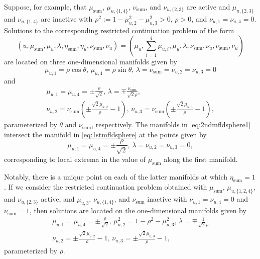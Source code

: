 Suppose, for example, that $\mu_\mathrm{sum}$, $\mu_{u,\{1,4\}}$, $\nu_\mathrm{sum}$, and $\nu_{u,\{2,3\}}$ are active and $\mu_{u,\{2,3\}}$ and $\nu_{u,\{1,4\}}$ are inactive with $\rho^2:=1-\mu_{u,2}^2-\mu_{u,3}^2>0$, $\rho>0$, and $\nu_{u,1}=\nu_{u,4}=0$. Solutions to the corresponding restricted continuation problem of the form
\begin{equation}
\left(u,\mu_\mathrm{sum},\mu_{u},\lambda,\eta_\mathrm{sum},\eta_{u},\nu_\mathrm{sum},\nu_{u}\right)=\left(\mu_u,\sum_{i=1}^4\mu_{u,i},\mu_{u},\lambda,\nu_\mathrm{sum},\nu_{u},\nu_\mathrm{sum},\nu_{u}\right)
\end{equation}
are located on three one-dimensional manifolds given by
\begin{equation}
\label{eq:1stmfldsphere}
\mu_{u,1}=\rho\cos\theta,\,\mu_{u,4}=\rho\sin\theta,\,\lambda=\nu_\mathrm{sum}=\nu_{u,2}=\nu_{u,3}=0
\end{equation}
and
\begin{gather}
\label{eq:2ndmfldsphere1}
\mu_{u,1}=\mu_{u,4}=\pm\frac{\rho}{\sqrt{2}},\,\lambda=\mp\frac{\nu_\mathrm{sum}}{\sqrt{2}\rho},\\\nu_{u,2}=\nu_\mathrm{sum}\left(\pm\frac{\sqrt{2}\mu_{u,2}}{\rho}-1\right),\,\nu_{u,3}=\nu_\mathrm{sum}\left(\pm\frac{\sqrt{2}\mu_{u,3}}{\rho}-1\right),
\label{eq:2ndmfldsphere2}
\end{gather}
parameterized by $\theta$ and $\nu_\mathrm{sum}$, respectively. The manifolds in \eqref{eq:2ndmfldsphere1} intersect the manifold in \eqref{eq:1stmfldsphere} at the points given by
\begin{equation}
\mu_{u,1}=\mu_{u,4}=\pm\frac{\rho}{\sqrt{2}},\,\lambda=\nu_{u,2}=\nu_{u,3}=0,
\end{equation}
corresponding to local extrema in the value of $\mu_\mathrm{sum}$ along the first manifold.

Notably, there is a unique point on each of the latter manifolds at which $\eta_\mathrm{sum}=1$. If we consider the restricted continuation problem obtained with $\mu_\mathrm{sum}$, $\mu_{u,\{1,2,4\}}$, and $\nu_{u,\{2,3\}}$ active, and $\mu_{u,3}$, $\nu_{u,\{1,4\}}$, and $\nu_\mathrm{sum}$ inactive with $\nu_{u,1}=\nu_{u,4}=0$ and $\nu_\mathrm{sum}=1$, then solutions are located on the one-dimensional manifolds given by
\begin{gather}
\label{eq:3rdmfldsphere1}
\mu_{u,1}=\mu_{u,4}=\pm\frac{\rho}{\sqrt{2}},\,\mu_{u,2}^2=1-\rho^2-\mu_{u,3}^2,\,\lambda=\mp\frac{1}{\sqrt{2}\rho}\\\nu_{u,2}=\pm\frac{\sqrt{2}\mu_{u,2}}{\rho}-1,\,\nu_{u,3}=\pm\frac{\sqrt{2}\mu_{u,3}}{\rho}-1,
\label{eq:3rdmfldsphere2}
\end{gather}
parameterized by $\rho$. 


